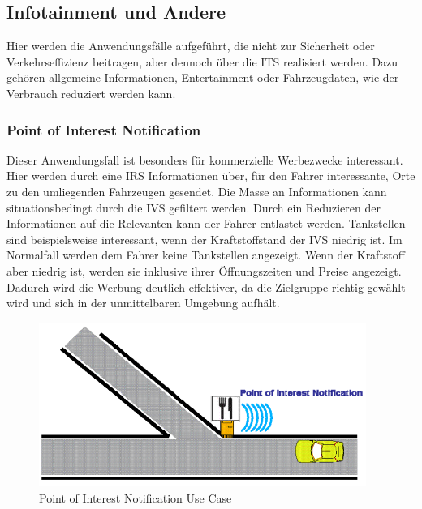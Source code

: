 \subsection{Infotainment und Andere}
Hier werden die Anwendungsfälle aufgeführt, die nicht zur Sicherheit oder Verkehrseffizienz beitragen, aber dennoch über die \ac{ITS} realisiert werden. Dazu gehören allgemeine Informationen, Entertainment oder Fahrzeugdaten, wie der Verbrauch reduziert werden kann. 

\subsubsection{Point of Interest Notification}
Dieser Anwendungsfall ist besonders für kommerzielle Werbezwecke interessant. Hier werden durch eine \ac{IRS} Informationen über, für den Fahrer interessante, Orte zu den umliegenden Fahrzeugen gesendet. Die Masse an Informationen kann situationsbedingt durch die \ac{IVS} gefiltert werden. Durch ein Reduzieren der Informationen auf die Relevanten kann der Fahrer entlastet werden. Tankstellen sind beispielsweise interessant, wenn der Kraftstoffstand der \ac{IVS} niedrig ist. Im Normalfall werden dem Fahrer keine Tankstellen angezeigt. Wenn der Kraftstoff aber niedrig ist, werden sie inklusive ihrer Öffnungszeiten und Preise angezeigt. Dadurch wird die Werbung deutlich effektiver, da die Zielgruppe richtig gewählt wird und sich in der unmittelbaren Umgebung aufhält.

\begin{figure}[htbp]
\includegraphics[width=0.95\textwidth]{content/images/06_use_cases/poin.png}
\caption{Point of Interest Notification Use Case \cite{etsi102638}}
\label{fig:poin}
\end{figure}

